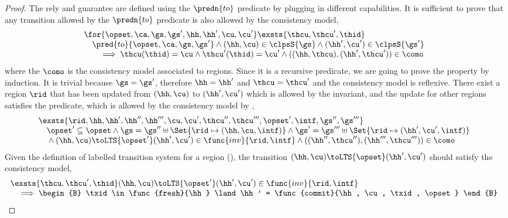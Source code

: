 \begin{proof}
The rely and guarantee are defined using the \( \predn{to}\) predicate by plugging in different capabilities.
It is sufficient to prove that any transition allowed by the \(\predn{to}\) predicate is also allowed by the consistency model,
\[
\begin{array}{@{}l}
    \for{\opset, \ca, \gs, \gs', \hh, \hh', \cu, \cu'}
    \exsts{\thcu, \thcu', \thid} \\
    \quad \pred{to}{\opset, \ca, \gs, \gs'} 
    \land (\hh, \cu) \in \clpsS{\gs}
    \land (\hh', \cu') \in \clpsS{\gs'} \\
    \qquad \implies 
    \thcu(\thid) = \cu
    \land \thcu'(\thid) = \cu'
    \land ((\hh, \thcu),(\hh', \thcu')) \in \como
\end{array}
\]
where the \( \como \) is the consistency model associated to regions.
Since it is a recursive predicate, we are going to prove the property by induction.
\caseB{\(\opset = \unitO\)}
It is trivial because \(\gs = \gs'\), therefore \( \hh = \hh' \) and \( \thcu = \thcu' \) and the consistency model is reflexive.
\caseI{\(\opset \neq \unitO\)}
There exist a region \( \rid \) that has been updated from \( (\hh, \cu) \) to \( (\hh', \cu') \) which is allowed by the invariant, and the update for other regions satisfies the  predicate, which is allowed by the consistency model by \ih,
\[
    \begin{array}[t]{@{}l}
    \exsts{\rid, \hh, \hh', \hh'', \hh''', \cu, \cu', \thcu'', \thcu''', \opset', \intf, \gs'',\gs''' }  \\
    \quad \opset' \subseteq \opset
    \land \gs = \gs'' \uplus \Set{\rid \mapsto (\hh, \cu, \intf)} 
    \land \gs' = \gs''' \uplus \Set{\rid \mapsto (\hh', \cu', \intf)}  \\
    \quad {} \land (\hh,\cu) \toLTS{\opset'} (\hh',\cu') \in \func{inv}{\rid, \intf }
    \land ((\hh'', \thcu''),(\hh''',\thcu''')) \in \como
    \end{array}
\]
Given the definition of labelled transition system for a region (), the transition \( (\hh, \cu) \toLTS{\opset} (\hh', \cu') \) should satisfy the consistency model,
\[
\begin{array}{@{}l}
    \exsts{ \thcu, \thcu', \thid } 
    (\hh, \cu) \toLTS{\opset'} (\hh', \cu') \in \func{inv}{\rid, \intf} \\
    \quad \implies
    \begin{B}
    \txid \in \func{fresh}{\hh} 
    \land \hh' = \func{commit}{\hh, \cu, \txid, \opset} 

\end{B}
\end{array}\]
\end{proof}
